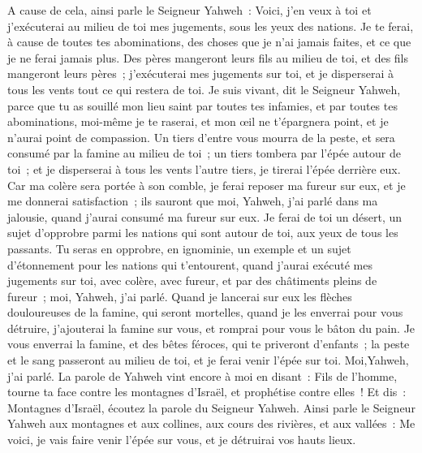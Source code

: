 \begin{multicols}{2}
A cause de cela, ainsi parle le Seigneur Yahweh~: Voici, j'en veux à toi et j'exécuterai au milieu de toi mes jugements, sous les yeux des nations.
Je te ferai, à cause de toutes tes abominations, des choses que je n'ai jamais faites, et ce que je ne ferai jamais plus.
Des pères mangeront leurs fils au milieu de toi, et des fils mangeront leurs pères~; j'exécuterai mes jugements sur toi, et je disperserai à tous les vents tout ce qui restera de toi.
Je suis vivant, dit le Seigneur Yahweh, parce que tu as souillé mon lieu saint par toutes tes infamies, et par toutes tes abominations, moi-même je te raserai, et mon œil ne t'épargnera point, et je n'aurai point de compassion.
Un tiers d'entre vous mourra de la peste, et sera consumé par la famine au milieu de toi~; un tiers tombera par l'épée autour de toi~; et je disperserai à tous les vents l'autre tiers, je tirerai l'épée derrière eux.
Car ma colère sera portée à son comble, je ferai reposer ma fureur sur eux, et je me donnerai satisfaction~; ils sauront que moi, Yahweh, j'ai parlé dans ma jalousie, quand j'aurai consumé ma fureur sur eux.
Je ferai de toi un désert, un sujet d'opprobre parmi les nations qui sont autour de toi, aux yeux de tous les passants.
Tu seras en opprobre, en ignominie, un exemple et un sujet d'étonnement pour les nations qui t'entourent, quand j'aurai exécuté mes jugements sur toi, avec colère, avec fureur, et par des châtiments pleins de fureur~; moi, Yahweh, j'ai parlé.
Quand je lancerai sur eux les flèches douloureuses de la famine, qui seront mortelles, quand je les enverrai pour vous détruire, j'ajouterai la famine sur vous, et romprai pour vous le bâton du pain.
Je vous enverrai la famine, et des bêtes féroces, qui te priveront d'enfants~; la peste et le sang passeront au milieu de toi, et je ferai venir l'épée sur toi. Moi,Yahweh, j'ai parlé.
\VerseOne{}La parole de Yahweh vint encore à moi en disant~:
Fils de l'homme, tourne ta face contre les montagnes d'Israël, et prophétise contre elles~!
Et dis~: Montagnes d'Israël, écoutez la parole du Seigneur Yahweh. Ainsi parle le Seigneur Yahweh aux montagnes et aux collines, aux cours des rivières, et aux vallées~: Me voici, je vais faire venir l'épée sur vous, et je détruirai vos hauts lieux.

\end{multicols}

